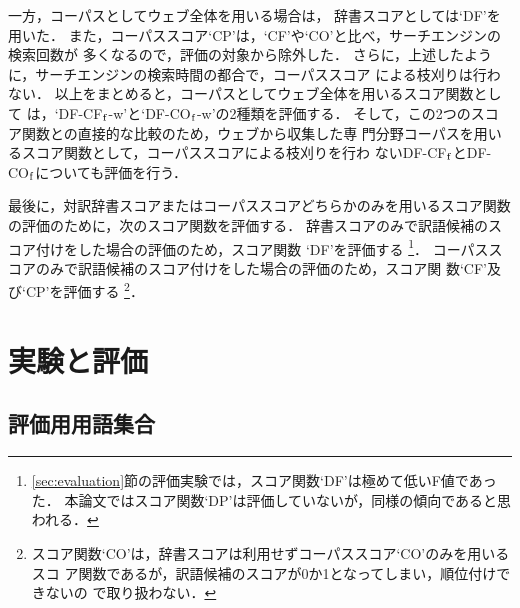 \documentclass[japanese]{jnlp_1.3a}
\begin{document}
一方，コーパスとしてウェブ全体を用いる場合は，
辞書スコアとしては`DF'を用いた．
また，コーパススコア`CP'は，`CF'や`CO'と比べ，サーチエンジンの検索回数が
多くなるので，評価の対象から除外した．
さらに，上述したように，サーチエンジンの検索時間の都合で，コーパススコア
による枝刈りは行わない．
以上をまとめると，コーパスとしてウェブ全体を用いるスコア関数として
は，`DF-CF${\rm _f}$-w'と`DF-CO${\rm _f}$-w'の2種類を評価する．
そして，この2つのスコア関数との直接的な比較のため，ウェブから収集した専
門分野コーパスを用いるスコア関数として，コーパススコアによる枝刈りを行わ
ないDF-CF${\rm _f}$とDF-CO${\rm _f}$についても評価を行う．

最後に，対訳辞書スコアまたはコーパススコアどちらかのみを用いるスコア関数
の評価のために，次のスコア関数を評価する．
辞書スコアのみで訳語候補のスコア付けをした場合の評価のため，スコア関数
`DF'を評価する
\footnote{
\ref{sec:evaluation}節の評価実験では，スコア関数`DF'は極めて低いF値であっ
た．
本論文ではスコア関数`DP'は評価していないが，同様の傾向であると思われる．
}．
コーパススコアのみで訳語候補のスコア付けをした場合の評価のため，スコア関
数`CF'及び`CP'を評価する
\footnote{
スコア関数`CO'は，辞書スコアは利用せずコーパススコア`CO'のみを用いるスコ
ア関数であるが，訳語候補のスコアが0か1となってしまい，順位付けできないの
で取り扱わない．
}．




\section{実験と評価}
\label{sec:experiments}

\subsection{評価用用語集合}
\label{sec:evaluation_set}
\end{document}
